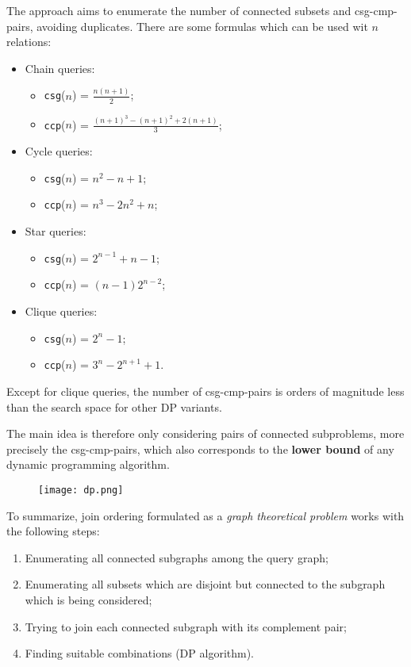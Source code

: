 The approach aims to enumerate the number of connected subsets and csg-cmp-pairs, avoiding duplicates. There are some formulas which can be used wit $n$ relations:
\begin{itemize}
	\item Chain queries:
	\begin{itemize}
		\item \texttt{csg}($n$) = $\frac{n(n+1)}{2}$;
		\item \texttt{ccp}($n$) = $\frac{(n+1)^3 - (n+1)^2 + 2(n+1)}{3}$;
	\end{itemize}
	\item Cycle queries:
	\begin{itemize}
		\item \texttt{csg}($n$) = $n^2 - n + 1$;
		\item \texttt{ccp}($n$) = $n^3 - 2n^2 + n$;
	\end{itemize}
	\item Star queries:
	\begin{itemize}
		\item \texttt{csg}($n$) = $2^{n-1} + n - 1$;
		\item \texttt{ccp}($n$) = $(n-1)2^{n-2}$;
	\end{itemize}
	\item Clique queries:
	\begin{itemize}
		\item \texttt{csg}($n$) = $2^n - 1$;
		\item \texttt{ccp}($n$) = $3^n - 2^{n+1} + 1$.
	\end{itemize}
\end{itemize}
Except for clique queries, the number of csg-cmp-pairs is orders of magnitude less than the search space for other DP variants.

The main idea is therefore only considering pairs of connected subproblems, more precisely the csg-cmp-pairs, which also corresponds to the \textbf{lower bound} of any dynamic programming algorithm. 

\begin{figure}[h]
	\texttt{[image: dp.png]}
	\centering
\end{figure}

To summarize, join ordering formulated as a \textit{graph theoretical problem} works with the following steps:

\begin{enumerate}
	\item Enumerating all connected subgraphs among the query graph;
	\item Enumerating all subsets which are disjoint but connected to the subgraph which is being considered;
	\item Trying to join each connected subgraph with its complement pair;
	\item Finding suitable combinations (DP algorithm).
\end{enumerate}


